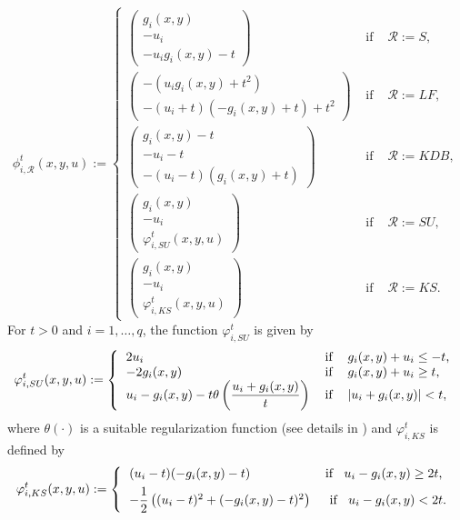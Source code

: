 \begin{equation}
    \phi^t_{i, \mathcal{R}}(x, y, u):=\left\{ 
    \begin{array}{lll}
       \left(\begin{array}{cc}
            g_i(x,y)  \\
            -u_i\\
            -u_i g_i(x,y)-t
       \end{array} \right)  &  \mbox{ if } & \mathcal{R}:=S,\\[1.5ex]
\left(\begin{array}{cc}
           -(u_{i}g_{i}(x,y)+t^{2}) \\[1ex]
-(u_{i}+t)(-g_{i}(x,y)+t)+t^{2}
       \end{array} \right)  &  \mbox{ if } & \mathcal{R}:=LF,\\[3ex]
\left(\begin{array}{cc}
            g_i(x,y) -t  \\
            -u_i - t\\
            -(u_i -t)(g_i(x,y) + t)
       \end{array} \right)  &  \mbox{ if } & \mathcal{R}:=KDB,\\[3ex]
 \left(\begin{array}{cc}
            g_i(x,y)  \\ 
            -u_i\\
            \varphi^t_{i, SU}(x,y,u)
       \end{array} \right)  &  \mbox{ if } & \mathcal{R}:= SU,\\[3ex]
 \left(\begin{array}{cc}
            g_i(x,y)  \\
            -u_i\\
             \varphi^t_{i, KS}(x,y,u)
       \end{array} \right)  &  \mbox{ if } & \mathcal{R}:=KS.
    \end{array}
    \right.
\end{equation}
For $t>0$ and $i=1, \ldots, q$, the function $\varphi^t_{i, SU}$ is given by
\[
\varphi^t_{i, SU}(x,y,u):=\left\{
\begin{tabular}
[c]{lll}
$2u_{i}$ & if & $g_{i}(x,y)+u_{i}\leq-t$,\\
$-2g_{i}(x,y)$ & if & $g_{i}(x,y)+u_{i}\geq t$,\\
$u_{i}-g_{i}(x,y)-t\theta\left(\dfrac{u_{i}+g_{i}(x,y)}{t}\right)$ & if & $\left\vert
u_{i}+g_{i}(x,y)\right\vert <t,$
\end{tabular}
\right.
\]
where $\theta(\cdot)$ is a suitable regularization function (see details in \cite{SU}) 
and $\varphi^t_{i, KS}$ is defined by
\[
\varphi^t_{i, KS}(x,y,u):=\left\{
\begin{tabular}
[c]{ll}
$(u_{i}-t)(-g_{i}(x,y)-t)$ & $\text{if\;\; } u_{i}-g_{i}(x,y)\geq2t$,\\[1ex]
$-\dfrac{1}{2}\left((u_{i}-t)^{2}+(-g_{i}(x,y)-t)^{2}\right)$ & $\text{\ if\;\; }u_{i}
-g_{i}(x,y)<2t.$
\end{tabular}
\right.
\]

